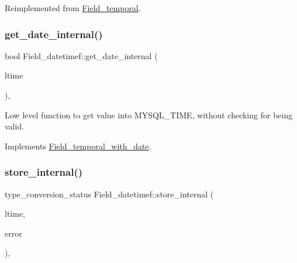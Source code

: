 Reimplemented from \mbox{\hyperlink{classField__temporal_ac97041d80803a32c6fb9250bfa0c9200}{Field\+\_\+temporal}}.

\mbox{\label{classField__datetimef_a54497950174c5034fd1ffd97e08bc368}} 
\subsubsection{\texorpdfstring{get\+\_\+date\+\_\+internal()}{get\_date\_internal()}}
{\footnotesize\ttfamily bool Field\+\_\+datetimef\+::get\+\_\+date\+\_\+internal (\begin{DoxyParamCaption}\item[{M\+Y\+S\+Q\+L\+\_\+\+T\+I\+ME $\ast$}]{ltime }\end{DoxyParamCaption})\hspace{0.3cm}{\ttfamily [protected]}, {\ttfamily [virtual]}}

Low level function to get value into M\+Y\+S\+Q\+L\+\_\+\+T\+I\+ME, without checking for being valid. 

Implements \mbox{\hyperlink{classField__temporal__with__date_aef905f77b5430dd2b3ef461ce916b4ef}{Field\+\_\+temporal\+\_\+with\+\_\+date}}.

\mbox{\label{classField__datetimef_a15efe08f94a2a01938ceb8b5bed6aa4f}} 
\subsubsection{\texorpdfstring{store\+\_\+internal()}{store\_internal()}}
{\footnotesize\ttfamily type\+\_\+conversion\+\_\+status Field\+\_\+datetimef\+::store\+\_\+internal (\begin{DoxyParamCaption}\item[{const M\+Y\+S\+Q\+L\+\_\+\+T\+I\+ME $\ast$}]{ltime,  }\item[{int $\ast$}]{error }\end{DoxyParamCaption})\hspace{0.3cm}{\ttfamily [protected]}, {\ttfamily [virtual]}}

